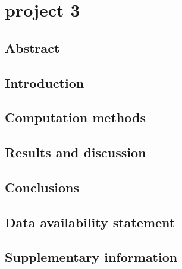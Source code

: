 \chapter{project 3}
\label{cha:project_3}

\section{Abstract}
\label{3_abstract}

\section{Introduction}
\label{3_introduction}

\section{Computation methods}
\label{3_calculation_methods}

\section{Results and discussion}
\label{3_results}

\section{Conclusions}
\label{3_conclusions}

\section{Data availability statement}

\section{Supplementary information}
\label{3_supplementary}
